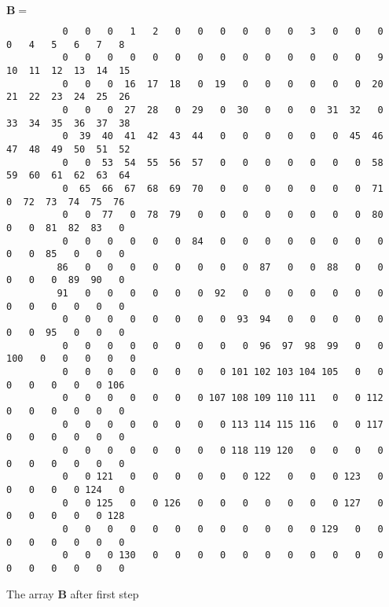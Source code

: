 \begin{listado}                                                                                
$\mathbf{B} = $                                                                                
\tiny                                                                                          
\begin{verbatim}                                                                               
          0   0   0   1   2   0   0   0   0   0   0   3   0   0   0   0   4   5   6   7   8
          0   0   0   0   0   0   0   0   0   0   0   0   0   0   9  10  11  12  13  14  15
          0   0   0  16  17  18   0  19   0   0   0   0   0   0  20  21  22  23  24  25  26
          0   0   0  27  28   0  29   0  30   0   0   0  31  32   0  33  34  35  36  37  38
          0  39  40  41  42  43  44   0   0   0   0   0   0  45  46  47  48  49  50  51  52
          0   0  53  54  55  56  57   0   0   0   0   0   0   0  58  59  60  61  62  63  64
          0  65  66  67  68  69  70   0   0   0   0   0   0   0  71   0  72  73  74  75  76
          0   0  77   0  78  79   0   0   0   0   0   0   0   0  80   0   0  81  82  83   0
          0   0   0   0   0   0  84   0   0   0   0   0   0   0   0   0   0  85   0   0   0
         86   0   0   0   0   0   0   0   0  87   0   0  88   0   0   0   0   0  89  90   0
         91   0   0   0   0   0   0  92   0   0   0   0   0   0   0   0   0   0   0   0   0
          0   0   0   0   0   0   0   0  93  94   0   0   0   0   0   0   0  95   0   0   0
          0   0   0   0   0   0   0   0   0  96  97  98  99   0   0 100   0   0   0   0   0
          0   0   0   0   0   0   0   0 101 102 103 104 105   0   0   0   0   0   0   0 106
          0   0   0   0   0   0   0 107 108 109 110 111   0   0 112   0   0   0   0   0   0
          0   0   0   0   0   0   0   0 113 114 115 116   0   0 117   0   0   0   0   0   0
          0   0   0   0   0   0   0   0 118 119 120   0   0   0   0   0   0   0   0   0   0
          0   0 121   0   0   0   0   0   0 122   0   0   0 123   0   0   0   0   0 124   0
          0   0 125   0   0 126   0   0   0   0   0   0   0 127   0   0   0   0   0   0 128
          0   0   0   0   0   0   0   0   0   0   0   0 129   0   0   0   0   0   0   0   0
          0   0   0 130   0   0   0   0   0   0   0   0   0   0   0   0   0   0   0   0   0
\end{verbatim}                                                                                 
\caption{The array $\mathbf{B}$ after first step}                                              
\label{lis:arrayb}                                                                             
\end{listado}                                                                                  
                                                                                               
